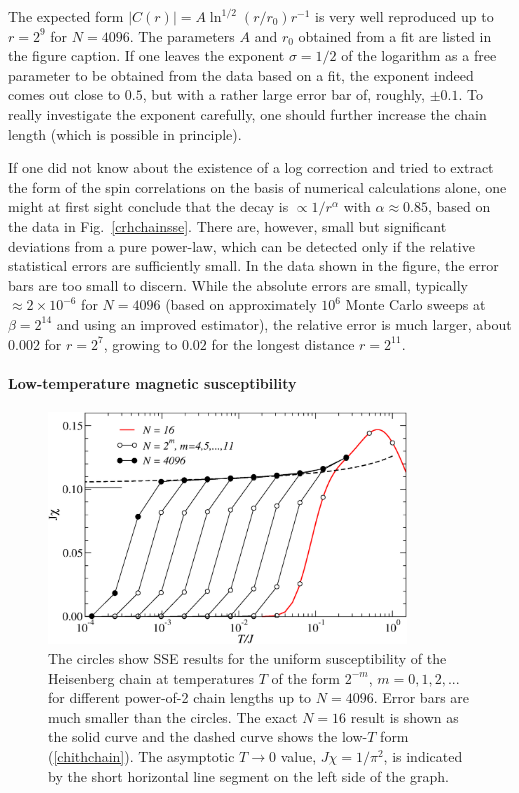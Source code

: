 \documentclass[draft,numberedheadings]{aipproc}
\begin{document}
The expected form $|C(r)|=A\ln^{1/2}(r/r_0)r^{-1}$ \cite{affleck2,singh1,giamarchi} is very well reproduced up to $r=2^9$ for $N=4096$. The parameters 
$A$ and $r_0$ obtained from a fit are listed in the figure caption. If one leaves the exponent $\sigma=1/2$ of the logarithm as a free parameter to
be obtained from the data based on a fit, the exponent indeed comes out close to $0.5$, but with a rather large error bar of, roughly, $\pm 0.1$. To 
really investigate the exponent carefully, one should further increase the chain length (which is possible in principle).

If one did not know about the existence of a log correction and tried to extract the form of the spin correlations on the basis of numerical calculations alone,
one might at first sight conclude that the decay is $\propto 1/r^\alpha$ with $\alpha \approx 0.85$, based on the data in Fig.~\ref{crhchainsse}. There 
are, however, small but significant deviations from a pure power-law, which can be detected only if the relative statistical errors are sufficiently small. In 
the data shown in the figure, the error bars are too small to discern. While the absolute errors are small, typically $\approx 2\times 10^{-6}$ for $N=4096$ 
(based on approximately $10^{6}$ Monte Carlo sweeps at $\beta=2^{14}$ and using an improved estimator), the relative error is much larger, about $0.002$ 
for $r=2^7$, growing to $0.02$ for the longest distance $r=2^{11}$. 

\paragraph{Low-temperature magnetic susceptibility}

\begin{figure}
\includegraphics[width=9.5cm, clip]{ususc.eps}
\caption{The circles show SSE results for the uniform susceptibility of the Heisenberg chain at temperatures $T$ of the form $2^{-m}$, $m=0,1,2,...$ for 
different power-of-2 chain lengths up to $N=4096$. Error bars are much smaller than the circles. The exact $N=16$ result is shown as the solid curve and 
the dashed curve shows the low-$T$ form (\ref{chithchain}). The asymptotic $T \to 0$ value, $J\chi=1/\pi^2$, is indicated by the short horizontal line 
segment on the left side of the graph.}
\label{xchainsse}
\end{figure}
\end{document}
